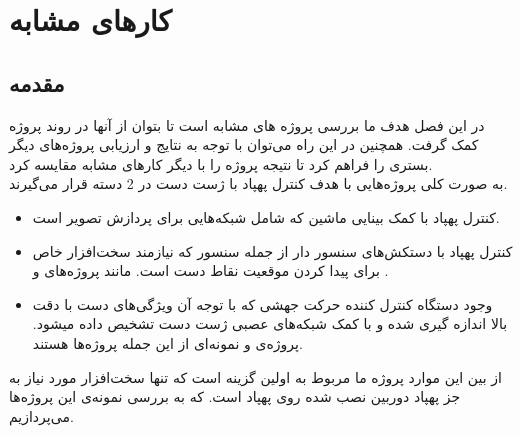 \chapter{کار‌های مشابه}
\section{مقدمه}
در این فصل هدف ما بررسی پروژه های مشابه است تا بتوان از آنها در روند پروژه کمک گرفت. همچنین در این راه می‌توان با توجه به نتایج و ارزیابی پروژه‌های دیگر بستری را فراهم کرد تا نتیجه پروژه را با دیگر کارهای مشابه مقایسه کرد.
\\
به صورت کلی پروژه‌هایی با هدف کنترل پهپاد با ژست دست در 2 دسته قرار می‌گیرند.
\begin{itemize}
    \item کنترل پهپاد با کمک بینایی ماشین که شامل شبکه‌هایی برای پردازش تصویر است. 
    \item کنترل پهپاد با دستکش‌های سنسور دار از جمله سنسور  که نیازمند سخت‌افزار خاص برای پیدا کردن موقعیت نقاط دست است. مانند پروژه‌های  \cite{yoo2022motion} و  \cite{ma2017hand}.
    \item وجود دستگاه کنترل کننده حرکت جهشی که با توجه آن ویژگی‌های دست با دقت بالا اندازه گیری شده و با کمک شبکه‌های عصبی ژست دست تشخیص داده میشود. پروژه‌ی
     \cite{hu2020deep} و  \cite{sarkar2016gesture} نمونه‌ای از این جمله پروژه‌ها هستند. 
\end{itemize}

از بین این موارد پروژه ما مربوط به اولین گزینه است که تنها سخت‌افزار مورد نیاز به جز پهپاد دوربین نصب شده روی پهپاد است. که به بررسی نمونه‌ی این پروژه‌ها می‌پردازیم.


